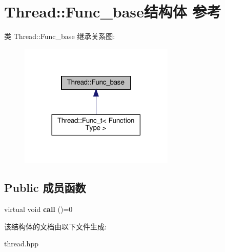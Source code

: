 \hypertarget{structThread_1_1Func__base}{}\section{Thread\+:\+:Func\+\_\+base结构体 参考}
\label{structThread_1_1Func__base}


类 Thread\+:\+:Func\+\_\+base 继承关系图\+:\nopagebreak
\begin{figure}[H]
\begin{center}
\leavevmode
\includegraphics[width=209pt]{structThread_1_1Func__base__inherit__graph}
\end{center}
\end{figure}
\subsection*{Public 成员函数}
\begin{DoxyCompactItemize}
\item 
\mbox{\label{structThread_1_1Func__base_a53caa79f4dd5f1b90690a14e7c1e0437}} 
virtual void {\bfseries call} ()=0
\end{DoxyCompactItemize}


该结构体的文档由以下文件生成\+:\begin{DoxyCompactItemize}
\item 
thread.\+hpp\end{DoxyCompactItemize}
